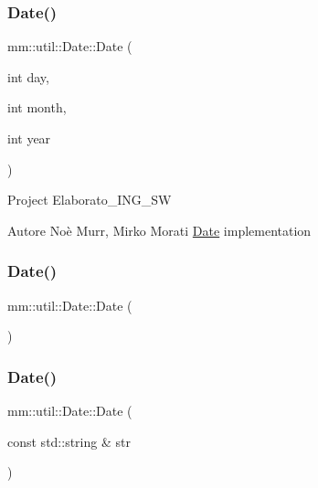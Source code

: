 \subsubsection{\texorpdfstring{Date()}{Date()}\hspace{0.1cm}{\footnotesize\ttfamily [1/3]}}
{\footnotesize\ttfamily mm\+::util\+::\+Date\+::\+Date (\begin{DoxyParamCaption}\item[{int}]{day,  }\item[{int}]{month,  }\item[{int}]{year }\end{DoxyParamCaption})}

Project Elaborato\+\_\+\+I\+N\+G\+\_\+\+SW \begin{DoxyAuthor}{Autore}
Noè Murr, Mirko Morati \hyperlink{structmm_1_1util_1_1_date}{Date} implementation 
\end{DoxyAuthor}
\mbox{\label{structmm_1_1util_1_1_date_a9aaf2c2d5171e081541831c4a756232e}} 
\subsubsection{\texorpdfstring{Date()}{Date()}\hspace{0.1cm}{\footnotesize\ttfamily [2/3]}}
{\footnotesize\ttfamily mm\+::util\+::\+Date\+::\+Date (\begin{DoxyParamCaption}{ }\end{DoxyParamCaption})}

\mbox{\label{structmm_1_1util_1_1_date_a9065cbdea26e95cfbb6537a5ba06f45d}} 
\subsubsection{\texorpdfstring{Date()}{Date()}\hspace{0.1cm}{\footnotesize\ttfamily [3/3]}}
{\footnotesize\ttfamily mm\+::util\+::\+Date\+::\+Date (\begin{DoxyParamCaption}\item[{const std\+::string \&}]{str }\end{DoxyParamCaption})}



